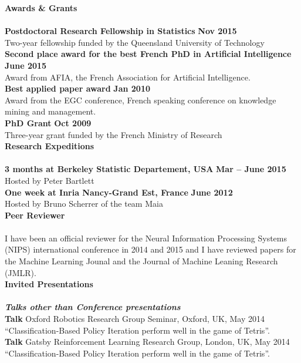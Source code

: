\noindent\textbf{Awards \& Grants}\\[-.4cm]\noindent\makebox[\linewidth]{\rule{\columnwidth}{0.4pt}}\\[.1cm]
\noindent\textbf{Postdoctoral Research Fellowship in Statistics} \hfill \textbf{Nov 2015} \\
Two-year fellowship funded by the Queensland University of Technology\\
\noindent\textbf{Second place award for the best French PhD in Artificial Intelligence }  \hfill \textbf{June 2015}\\
Award from AFIA, the French Association for Artificial Intelligence.\\
\textbf{Best applied paper award}  \hfill \textbf{ Jan 2010}\\
Award from the EGC conference, French speaking conference on knowledge mining and management.\\
\textbf{PhD Grant}  \hfill \textbf{ Oct 2009}\\
Three-year grant funded by the French Ministry of Research\\[.2cm]

\noindent\textbf{Research Expeditions}\\[-.4cm]\noindent\makebox[\linewidth]{\rule{\columnwidth}{0.4pt}}\\[.1cm]
\noindent\textbf{3 months at Berkeley Statistic Departement, USA} \hfill \textbf{Mar -- June 2015} \\
Hosted by Peter Bartlett\\
\noindent\textbf{One week at Inria Nancy-Grand Est, France} \hfill \textbf{June 2012} \\
Hosted by Bruno Scherrer of the team Maia\\

\noindent\textbf{Peer Reviewer}\\[-.4cm]\noindent\makebox[\linewidth]{\rule{\columnwidth}{0.4pt}}\\[.1cm]
I have been an official reviewer for the Neural Information Processing Systems (NIPS) international conference in 2014 and 2015 and I have reviewed papers for the Machine Learning Jounal and the Journal of Machine Leaning Research (JMLR).\\


\noindent 
\textbf{Invited Presentations}
\\[-.4cm]\noindent\makebox[\linewidth]{\rule{\columnwidth}{0.4pt}}\\[.1cm]
\textbf{\textit{Talks other than Conference presentations}}\\
\textbf{Talk} Oxford Robotics Research Group Seminar, Oxford, UK, May 2014\\
 ``Classification-Based Policy Iteration perform well in the game of Tetris''.\\
\noindent \textbf{Talk} Gatsby Reinforcement Learning Research Group, London, UK, May 2014\\
 ``Classification-Based Policy Iteration perform well in the game of Tetris''.
  
